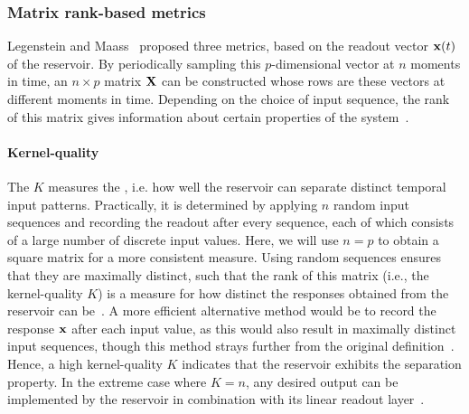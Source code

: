 \subsubsection{Matrix rank-based metrics} \label{sec:1:RC_metrics_KQ}
Legenstein and Maass~\cite{WhatMakesPowerful} proposed three metrics, based on the readout vector $\boldsymbol{\mathbf{x}}(t)$ of the reservoir.
By periodically sampling this $p$-dimensional vector at $n$ moments in time, an $n \times p$ matrix $\boldsymbol{\mathbf{X}}$ can be constructed whose rows are these vectors at different moments in time.
Depending on the choice of input sequence, the rank of this matrix gives information about certain properties of the system~\cite{RC_ASI}.

\paragraph{Kernel-quality}
The  $K$ measures the , i.e. how well the reservoir can separate distinct temporal input patterns.
Practically, it is determined by applying $n$ random input sequences and recording the readout after every sequence, each of which consists of a large number of discrete input values.
Here, we will use $n=p$ to obtain a square matrix for a more consistent measure.
Using random sequences ensures that they are maximally distinct, such that the rank of this matrix (i.e., the kernel-quality $K$) is a measure for how distinct the responses obtained from the reservoir can be~\cite{Vidamour_2022}.
A more efficient alternative method would be to record the response $\boldsymbol{\mathbf{x}}$ after each input value, as this would also result in maximally distinct input sequences, though this method strays further from the original definition~\cite{RC_HierarchicalNeuroevolution,RCbenchmarksReview1}.
Hence, a high kernel-quality $K$ indicates that the reservoir exhibits the separation property.
In the extreme case where $K=n$, any desired output can be implemented by the reservoir in combination with its linear readout layer~\cite{WhatMakesPowerful}.

